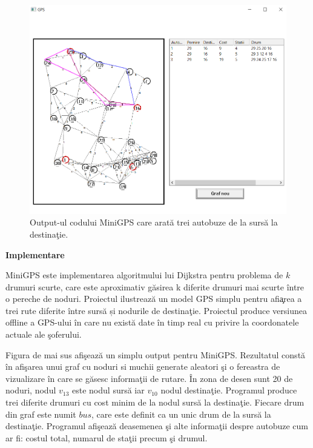\documentclass[11pt,a4paper]{report}
\begin{document}
        \vspace{0.3 cm}\begin{figure}[!hbt]
    	\centering
    	\includegraphics[width=13.2cm]{MiniGPS.png}
    	\caption{Output-ul codului MiniGPS care arat\u a trei autobuze de la surs\u a la destina\c tie.}
    \end{figure}


    \newpage
     \textbf{Implementare}
     
     
     \vspace{0.2cm} MiniGPS este implementarea algoritmului lui Dijkstra pentru problema de $k$ drumuri scurte,  care este aproximativ
     găsirea k diferite drumuri mai scurte \^ intre o pereche de noduri. Proiectul ilustreaz\u a un model GPS simplu
     pentru afi\c area a trei rute diferite \^ intre surs\u a și nodurile de destina\c tie. Proiectul
     produce versiunea offline a GPS-ului în care nu există date în timp real cu privire la coordonatele actuale ale
     \c soferului.
     
     Figura de mai sus afi\c seaz\u a un simplu output pentru MiniGPS. Rezultatul const\u a \^ in afi\c sarea unui graf cu noduri si muchii generate aleatori \c si o fereastra de vizualizare  \^ in care se g\u asesc informa\c tii de rutare. \^ In zona de desen sunt 20 de noduri, nodul $v_{13}$ este nodul surs\u a iar $v_{10}$ nodul destina\c tie. Programul produce trei diferite drumuri cu cost minim de la nodul surs\u a la destina\c tie. Fiecare drum din graf este numit $bus$, care este definit ca un unic drum de la surs\u a la destina\c tie. Programul afi\c seaz\u a deasemenea \c si alte informa\c tii despre autobuze cum ar fi: costul total, numarul de sta\c tii precum  \c si  drumul.
     
\end{document}

